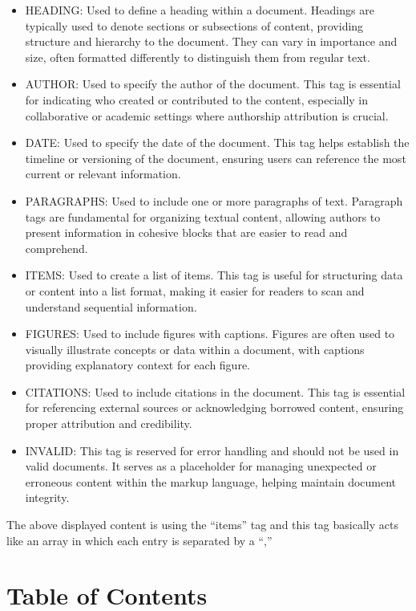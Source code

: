 \documentclass[oneside]{book}
\begin{document}
\begin{itemize}
\item HEADING: Used to define a heading within a document. Headings are typically used to denote sections or subsections of content, providing structure and hierarchy to the document. They can vary in importance and size, often formatted differently to distinguish them from regular text.
\item AUTHOR: Used to specify the author of the document. This tag is essential for indicating who created or contributed to the content, especially in collaborative or academic settings where authorship attribution is crucial.
\item DATE: Used to specify the date of the document. This tag helps establish the timeline or versioning of the document, ensuring users can reference the most current or relevant information.
\item PARAGRAPHS: Used to include one or more paragraphs of text. Paragraph tags are fundamental for organizing textual content, allowing authors to present information in cohesive blocks that are easier to read and comprehend.
\item ITEMS: Used to create a list of items. This tag is useful for structuring data or content into a list format, making it easier for readers to scan and understand sequential information.
\item FIGURES: Used to include figures with captions. Figures are often used to visually illustrate concepts or data within a document, with captions providing explanatory context for each figure.
\item CITATIONS: Used to include citations in the document. This tag is essential for referencing external sources or acknowledging borrowed content, ensuring proper attribution and credibility.
\item INVALID: This tag is reserved for error handling and should not be used in valid documents. It serves as a placeholder for managing unexpected or erroneous content within the markup language, helping maintain document integrity.
\end{itemize}
The above displayed content is using the ``items'' tag and this tag basically acts like an array in which each entry is separated by a ``,'' \par

\newpage
\chapter{Table of Contents}
\end{document}
